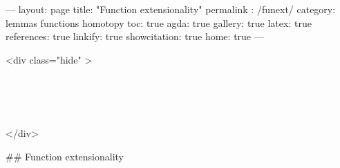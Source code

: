 ---
layout: page
title: "Function extensionality"
permalink : /funext/
category: lemmas functions homotopy
toc: true
agda: true
gallery: true
latex: true
references: true
linkify: true
showcitation: true
home: true
---

<div class="hide" >
\begin{code}%
\>[0]\AgdaSymbol{\{-\#}\AgdaSpace{}%
\AgdaSpace{}%
\AgdaSpace{}%
\AgdaSymbol{\#-\}}\<%
\\
\>[0]\AgdaSpace{}%
\AgdaSpace{}%
\<%
\\
\>[0]\AgdaSpace{}%
\AgdaSpace{}%
\<%
\\
\>[0]\AgdaSpace{}%
\AgdaSpace{}%
\<%
\end{code}
</div>

## Function extensionality

\begin{code}%
\>[0]\<%
\\
\>[0]\AgdaSpace{}%
\AgdaSpace{}%
\AgdaSymbol{\{}\AgdaSpace{}%
\AgdaSymbol{\}}\AgdaSpace{}%
\AgdaSymbol{\{}\AgdaSpace{}%
\AgdaSymbol{:}\AgdaSpace{}%
\AgdaSpace{}%
\AgdaSymbol{\}}\<%
\\
\>[0][@{}l@{\AgdaIndent{0}}]%
\>[2]\AgdaSymbol{\{}\AgdaSpace{}%
\AgdaSymbol{:}\AgdaSpace{}%
\AgdaSpace{}%
\AgdaSpace{}%
\AgdaSpace{}%
\AgdaSymbol{\}}\AgdaSpace{}%
\AgdaSymbol{\{}\AgdaSpace{}%
\AgdaSpace{}%
\AgdaSymbol{:}\AgdaSpace{}%
\AgdaSymbol{(}\AgdaSpace{}%
\AgdaSymbol{:}\AgdaSpace{}%
\AgdaSymbol{)}\AgdaSpace{}%
\AgdaSpace{}%
\AgdaSpace{}%
\AgdaSymbol{\}}\AgdaSpace{}%
\<%
\end{code}

